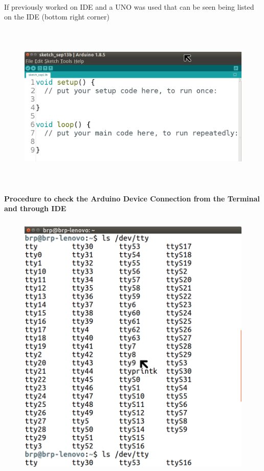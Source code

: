 \documentclass[12pt,a4paper]{article}
\begin{document}
\\
If previously worked on IDE and a UNO was used that can be seen being listed on the IDE (bottom right corner) 
\begin{figure}[h!]
    \centering
	\includegraphics[width=15cm, height=8cm]{Introduction/4.png}
\end{figure}
\clearpage
\textbf{Procedure to check the Arduino Device Connection from the Terminal and through IDE}
\begin{figure}[h!]
    \centering
	\includegraphics[width=15cm, height=13cm]{Introduction/5.png}
\end{figure}
\end{document}
